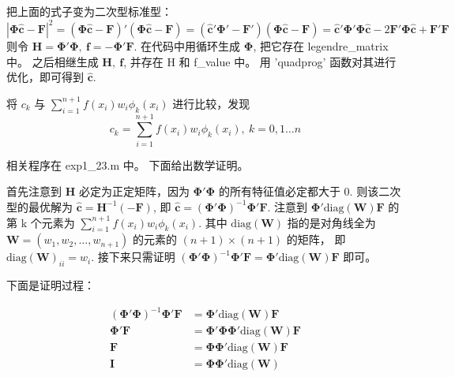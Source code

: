 \documentclass[11pt]{ctexart}
\begin{document}
    把上面的式子变为二次型标准型：
    \begin{equation}
        |\mathbf{\Phi} \mathbf{\hat{c}}-\mathbf F|^2=(\mathbf{\Phi} \mathbf {\hat{c}}-\mathbf F)'(\mathbf{\Phi} \mathbf {\hat{c}}-\mathbf F)=
        (\mathbf{\hat{c}}'\mathbf{\Phi}'-\mathbf{F}')(\mathbf{\Phi} \mathbf {\hat{c}}-\mathbf F)=
        \mathbf{\hat{c}}'\mathbf{\Phi}'\mathbf{\Phi}\mathbf{\hat{c}}-2\mathbf{F}'\mathbf{\Phi}\mathbf{\hat{c}}+\mathbf{F}'\mathbf{F}
    \end{equation}
    则令 \(\mathbf{H}=\mathbf{\Phi'\Phi},\ \mathbf{f}=-\mathbf{\Phi' F}\).
    在代码中用循环生成 \(\mathbf{\Phi}\), 把它存在 legendre\_matrix 中。
    之后相继生成 \(\mathbf{H},\ \mathbf{f}\), 并存在 H 和 f\_value 中。
    用 'quadprog' 函数对其进行优化，即可得到 \(\mathbf{\hat{c}}\).

    将 \(c_k\) 与 \(\sum_{i=1}^{n+1}f\left(x_{i}\right) w_{i} \phi_{k}\left(x_{i}\right)\) 进行比较，发现
    \begin{equation}
        c_k=\sum_{i=1}^{n+1}f\left(x_{i}\right) w_{i} \phi_{k}\left(x_{i}\right),\ k=0,1\dots n
    \end{equation}

    相关程序在 exp1\_23.m 中。
    下面给出数学证明。

    首先注意到 \(\mathbf{H}\) 必定为正定矩阵，因为 \(\mathbf{\Phi'\Phi}\) 的所有特征值必定都大于 0.
    则该二次型的最优解为 \(\mathbf{\hat{c}}=\mathbf{H}^{-1}\mathbf{(-F)}\), 即 \(\mathbf{\hat{c}}=(\mathbf{\Phi'\Phi})^{-1}\mathbf{\Phi' F}\).
    注意到 \(\mathbf{\Phi'}\text{diag}(\mathbf{W})\mathbf{F}\) 的第 k 个元素为 \(\sum_{i=1}^{n+1}f\left(x_{i}\right) w_{i} \phi_{k}\left(x_{i}\right)\).
    其中 \(\text{diag}(\mathbf{W})\) 指的是对角线全为 \(\mathbf{W}=(w_1,w_2,\dots ,w_{n+1})\) 的元素的 \((n+1)\times (n+1)\) 的矩阵，
    即 \(\text{diag}(\mathbf{W})_{ii}=w_i\).
    接下来只需证明 \((\mathbf{\Phi'\Phi})^{-1}\mathbf{\Phi' F}=\mathbf{\Phi'}\text{diag}(\mathbf{W})\mathbf{F}\) 即可。

    下面是证明过程：

    \begin{equation}
        \begin{aligned}
            (\mathbf{\Phi'\Phi})^{-1}\mathbf{\Phi' F} &=\mathbf{\Phi'}\text{diag}(\mathbf{W})\mathbf{F} \\
            \mathbf{\Phi' F} &=\mathbf{\Phi'\Phi}\mathbf{\Phi'}\text{diag}(\mathbf{W})\mathbf{F} \\
            \mathbf{F} &=\mathbf{\Phi}\mathbf{\Phi'}\text{diag}(\mathbf{W})\mathbf{F} \\
            \mathbf{I} &=\mathbf{\Phi}\mathbf{\Phi'}\text{diag}(\mathbf{W})
        \end{aligned}
    \end{equation}
\end{document}
